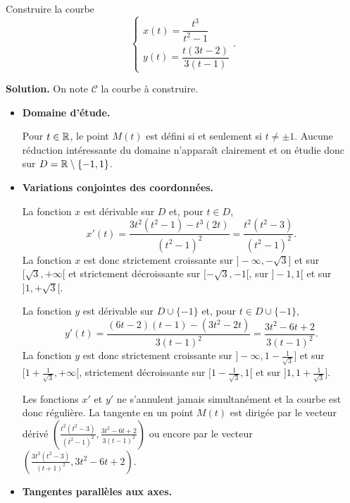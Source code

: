 \documentclass[class=report,crop=false]{standalone}
\begin{document}
\begin{exemple}
Construire la courbe
$$\left\{
\begin{array}{l}
x(t)=\dfrac{t^3}{t^2-1}\\[3mm]
y(t)=\dfrac{t(3t-2)}{3(t-1)}
\end{array}
\right..$$

\textbf{Solution.} On note $\mathcal{C}$ la courbe à construire.

\begin{itemize}
  \item \textbf{Domaine d'étude.}

Pour $t\in\mathbb{R}$, le point
$M(t)$ est défini si et seulement si $t\neq\pm1$. Aucune réduction intéressante
du domaine n'apparaît clairement et on étudie donc sur $D=\mathbb{R}\setminus\{-1,1\}$.


  \item \textbf{Variations conjointes des coordonnées.}

La fonction $x$ est dérivable sur $D$ et, pour $t\in D$,
$$x'(t)=\frac{3t^2(t^2-1)-t^3(2t)}{(t^2-1)^2}=\frac{t^2(t^2-3)}{(t^2-1)^2}.$$
La fonction $x$ est donc strictement croissante sur $]-\infty,-\sqrt{3}]$
et sur $[\sqrt{3},+\infty[$ et strictement décroissante sur $[-\sqrt{3},-1[$,
sur $]-1,1[$ et sur $]1,+\sqrt{3}[$.

\medskip

La fonction $y$ est dérivable sur $D\cup\{-1\}$ et, pour $t\in D\cup\{-1\}$,
$$y'(t)=\frac{(6t-2)(t-1)-(3t^2-2t)}{3(t-1)^2}=\frac{3t^2-6t+2}{3(t-1)^2}.$$
La fonction $y$ est donc strictement croissante sur
$]-\infty,1-\frac{1}{\sqrt{3}}]$ et sur $[1+\frac{1}{\sqrt{3}},+\infty[$,
strictement décroissante sur
$[1-\frac{1}{\sqrt{3}},1[$ et sur $]1,1+\frac{1}{\sqrt{3}}]$.

\medskip

Les fonctions $x'$ et $y'$ ne s'annulent jamais simultanément et
la courbe est donc régulière. La tangente en un point $M(t)$ est dirigée
par le vecteur dérivé $\left(\frac{t^2(t^2-3)}{(t^2-1)^2},\frac{3t^2-6t+2}{3(t-1)^2}\right)$ ou encore
par le vecteur $\left(\frac{3t^2(t^2-3)}{(t+1)^2},3t^2-6t+2\right)$.


\item \textbf{Tangentes parallèles aux axes.}


\end{itemize}
\end{exemple}
\end{document}
